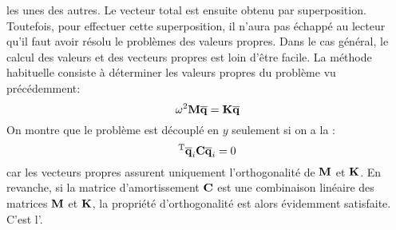 les unes des autres. Le vecteur total est ensuite obtenu par superposition.
\medskipvm
Toutefois, pour effectuer cette superposition, il n'aura pas échappé au lecteur qu'il faut
avoir résolu le problèmes des valeurs propres.
Dans le cas général, le calcul des valeurs et des vecteurs propres  est loin 
d'être facile.
La méthode habituelle consiste à déterminer les valeurs propres  du 
problème vu précédemment:
\begin{equation} \omega^2\MM{M}\VV{\overline{q}}=\MM{K}\VV{\overline{q}} \end{equation}
On montre que le problème est découplé en $y$ seulement si on a la : \begin{equation}\LL{\overline{q}}_i\MM{C}\VV{\overline{q}}_i=0\end{equation}
\medskipvm
{} car les vecteurs propres assurent uniquement 
l'orthogonalité de $\MM{M}$ et $\MM{K}$. 
\medskipvm
En revanche, si la matrice d'amortissement $\MM{C}$ est une combinaison linéaire des matrices $\MM{M}$ et 
$\MM{K}$, la propriété d'orthogonalité est alors évidemment satisfaite.
C'est l'.

